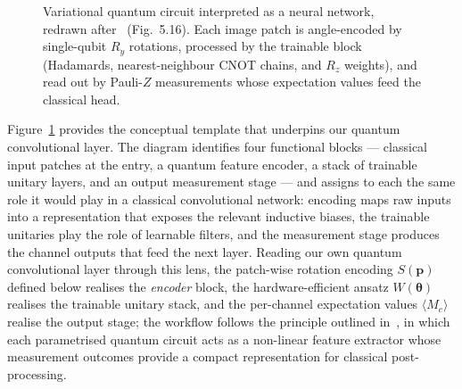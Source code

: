 \begin{figure}[htbp]
{
    }
    \caption{Variational quantum circuit interpreted as a neural network, redrawn after~\cite{SchuldPetruccione2021} (Fig.~5.16). Each image patch is angle-encoded by single-qubit $R_y$ rotations, processed by the trainable block (Hadamards, nearest-neighbour CNOT chains, and $R_z$ weights), and read out by Pauli-$Z$ measurements whose expectation values feed the classical head.}
    \label{fig:qconv_schematic}
\end{figure}

Figure~\ref{fig:qconv_schematic} provides the conceptual template that
underpins our quantum convolutional layer. The diagram identifies four
functional blocks — classical input patches at the entry, a quantum
feature encoder, a stack of trainable unitary layers, and an output
measurement stage — and assigns to each the same role it would play in
a classical convolutional network: encoding maps raw inputs into a
representation that exposes the relevant inductive biases, the trainable
unitaries play the role of learnable filters, and the measurement stage
produces the channel outputs that feed the next layer. Reading our own
quantum convolutional layer through this lens, the patch-wise rotation
encoding $S(\mathbf{p})$ defined below realises the
\emph{encoder} block, the hardware-efficient ansatz $W(\boldsymbol{\theta})$
realises the trainable unitary stack, and the per-channel expectation
values $\langle M_c\rangle$ realise the output stage; the workflow
follows the principle outlined in~\cite{SchuldPetruccione2021}, in
which each parametrised quantum circuit acts as a non-linear feature
extractor whose measurement outcomes provide a compact representation
for classical post-processing.



